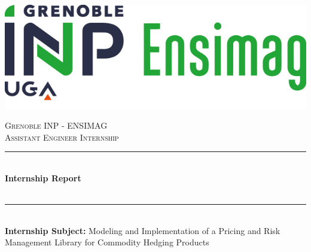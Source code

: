 \documentclass[12pt]{article}
\newcommand{\HRule}{\rule{\linewidth}{0.5mm}}
\begin{document}
\begin{titlepage}
  \begin{sffamily}
  \haut{}
  		{\includegraphics[scale=0.25]{logo_ensimag (1).png}} 
  		 \hspace{5cm}
  		   
  
  \begin{center}
    \vspace{1.5cm}
    \textsc{Grenoble INP - ENSIMAG} \\
    \textsc{Assistant Engineer Internship}\\[1cm]
    
    \HRule \\[0.4cm]
    { \huge \bfseries Internship Report \\ \texttt{}\\[0.4cm] }
    
    \HRule \\[1.5cm]
    
    \large{\textbf{Internship Subject:} Modeling and Implementation of a Pricing and Risk Management Library for Commodity Hedging Products}\\[1cm]
    

\end{center}
\end{sffamily}
\end{titlepage}
\end{document}
